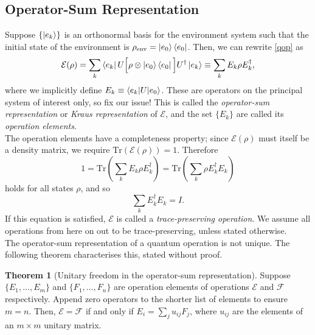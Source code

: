 \documentclass[12pt,a4paper]{report}
\numberwithin{equation}{section}
\newcommand{\ketbra}[2]{\ket{#1}\bra{#2}}
\newcommand{\ketbras}[1]{\ketbra{#1}{#1}}
\theoremstyle{definition}
\theoremstyle{theorem}
\newtheorem{theorem}{Theorem}[section]
\theoremstyle{theorem}
\theoremstyle{example}
\theoremstyle{definition}
\begin{document}
\subsection{Operator-Sum Representation}
Suppose $\{\ket{e_{k}}\}$ is an orthonormal basis for the environment system such that the initial state of the environment is $\rho_{\text{env}}=\ketbras{e_{0}}$. Then, we can rewrite \ref{qop} as
\begin{equation}\label{opel}
	\mathcal{E}(\rho)=\sum_{k}\bra{e_{k}}U\Big[\rho\otimes\ketbras{e_{0}}\Big]U^{\dagger}\ket{e_{k}}\equiv\sum_{k}E_{k}\rho E_{k}^{\dagger},
\end{equation}
where we implicitly define $E_{k}\equiv\braket{e_{k}|U|e_{0}}$. These are operators on the principal system of interest only, so fix our issue! This is called the \textit{operator-sum representation} or \textit{Kraus representation} of $\mathcal{E}$, and the set $\{E_{k}\}$ are called its \textit{operation elements}.\\
The operation elements have a completeness property; since $\mathcal{E}(\rho)$ must itself be a density matrix, we require $\text{Tr}(\mathcal{E}(\rho))=1$. Therefore
\begin{equation}
	1=\text{Tr}\left(\sum_{k}E_{k}\rho E_{k}^{\dagger}\right)=\text{Tr}\left(\sum_{k}\rho E_{k}^{\dagger}E_{k}\right)
\end{equation}
holds for all states $\rho$, and so
\begin{equation}
	\sum_{k}E_{k}^{\dagger}E_{k}=I.
\end{equation}
If this equation is satisfied, $\mathcal{E}$ is called a \textit{trace-preserving operation}. We assume all operations from here on out to be trace-preserving, unless stated otherwise.\\
The operator-sum representation of a quantum operation is not unique. The following theorem characterises this, stated without proof.
\begin{theorem}[Unitary freedom in the operator-sum representation]
	Suppose $\{E_{1},\ldots,E_{m}\}$ and $\{F_{1},\ldots,F_{n}\}$ are operation elements of operations $\mathcal{E}$ and $\mathcal{F}$ respectively. Append zero operators to the shorter list of elements to ensure $m=n$. Then, $\mathcal{E}=\mathcal{F}$ if and only if $E_{i}=\sum_{j}u_{ij}F_{j}$, where $u_{ij}$ are the elements of an $m\times m$ unitary matrix.
\end{theorem}
\end{document}
